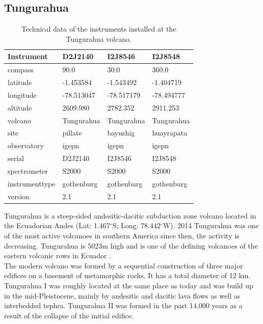 \subsection*{Tungurahua \label{Tung}}
\begin{table}
	\centering
	\begin{tabular}{|p{4cm}|p{3cm}|p{3cm}|p{3cm}|}
		Instrument    &D2J2140&I2J8546& I2J8548\\
		\toprule
		compass&90.0    &    30.0    &    360.0    \\
		latitude&-1.453584    &    -1.543492    &-1.404719    \\
		longitude&-78.513047    &-78.517179    &    -78.494777    \\
		altitude&2609.980    &    2782.352    &    2911.253    \\
		volcano&Tungurahua    &Tungurahua    &    Tungurahua    \\
		site&pillate    &    bayushig    &    huayrapata    \\
		observatory&igepn    &    igepn    &igepn    \\
		serial&D2J2140    &    I2J8546    &    I2J8548    \\
		spectrometer&S2000    &    S2000    &S2000    \\
		instrumenttype&gothenburg    &gothenburg    &gothenburg    \\
		version&2.1    &2.1    &    2.1    \\
		\bottomrule
	\end{tabular}
	\caption{Technical data of the instruments installed at the Tungurahua volcano.}
	\label{tab:TInstruments}
\end{table}
Tungurahua is a steep-sided andesitic-dacitic subduction zone volcano located in the Ecuadorian Andes (Lat: 1.467$^{\circ}$S; Long: 78.442$^{\circ}$W). 2014 Tungurahua was one of the most active volcanoes in southern America since then, the activity is decreasing. Tungurahua is 5023m high and is one of the defining volcanoes of the eastern volcanic rows in Ecuador \citep{hall1999tungurahua}.
\\
The modern volcano was formed by a sequential construction of three major edifices on a basement of metamorphic rocks. It has a total diameter of 12 km. Tungurahua I was roughly located at the same place as today and was build up in the mid-Pleistocene, mainly by andesitic and dacitic lava flows as well as interbedded tephra. Tungurahua II was formed in the past 14,000 years as a result of the collapse of the initial edifice.\\
